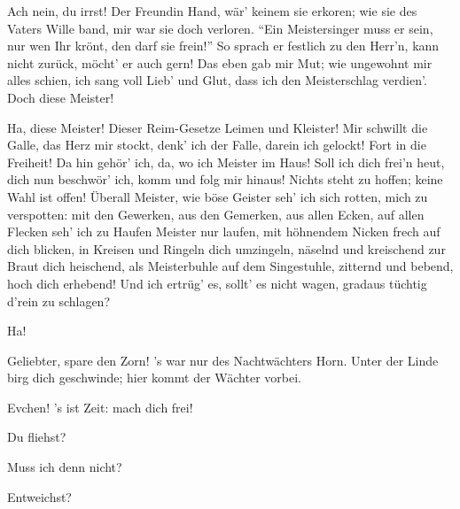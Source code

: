 \begin{drama}
\Waltherspeaks

Ach nein, du irrst! Der Freundin Hand,
wär' keinem sie erkoren;
wie sie des Vaters Wille band,
mir war sie doch verloren.
``Ein Meistersinger muss er sein,
nur wen Ihr krönt, den darf sie frein!''
So sprach er festlich zu den Herr'n,
kann nicht zurück, möcht' er auch gern!
Das eben gab mir Mut;
wie ungewohnt mir alles schien,
ich sang voll Lieb' und Glut,
dass ich den Meisterschlag verdien'.
Doch diese Meister!


Ha, diese Meister!
Dieser Reim-Gesetze Leimen und Kleister!
Mir schwillt die Galle,
das Herz mir stockt,
denk' ich der Falle,
darein ich gelockt!
Fort in die Freiheit!
Da hin gehör' ich,
da, wo ich Meister im Haus!
Soll ich dich frei'n heut,
dich nun beschwör' ich,
komm und folg mir hinaus!
Nichts steht zu hoffen;
keine Wahl ist offen!
Überall Meister,
wie böse Geister
seh' ich sich rotten,
mich zu verspotten:
mit den Gewerken,
aus den Gemerken,
aus allen Ecken,
auf allen Flecken
seh' ich zu Haufen
Meister nur laufen,
mit höhnendem Nicken
frech auf dich blicken,
in Kreisen und Ringeln
dich umzingeln,
näselnd und kreischend
zur Braut dich heischend,
als Meisterbuhle
auf dem Singestuhle,
zitternd und bebend,
hoch dich erhebend!
Und ich ertrüg' es, sollt' es nicht wagen,
gradaus tüchtig d'rein zu schlagen?


Ha!


\Evaspeaks


Geliebter, spare den Zorn!
's war nur des Nachtwächters Horn.
Unter der Linde birg dich geschwinde;
hier kommt der Wächter vorbei.

\Magdalenespeaks


Evchen! 's ist Zeit:
mach dich frei!

\Waltherspeaks
Du fliehst?

\Evaspeaks


Muss ich denn nicht?

\Waltherspeaks
Entweichst?

\Evaspeaks



\end{drama}
